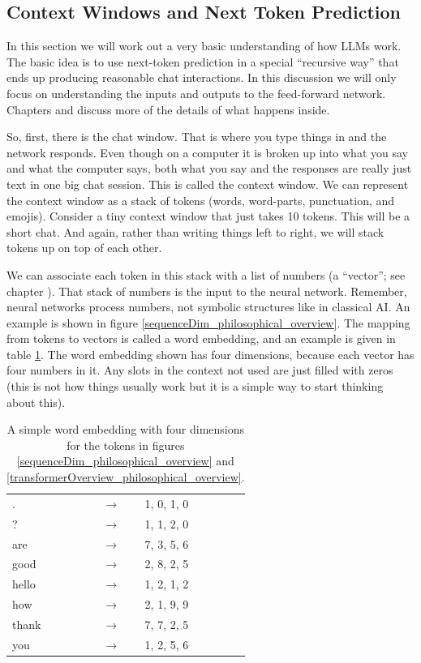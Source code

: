 \subsection{Context Windows and Next Token Prediction}

In this section we will work out a very basic understanding of how LLMs work. The basic idea is to use next-token prediction in a special ``recursive way'' that ends up producing reasonable chat interactions. In this discussion we will only focus on understanding the inputs and outputs to the feed-forward network. Chapters  and  discuss more of the details of what happens inside.

So, first, there is the chat window. That is where you type things in and the network responds. Even though on a computer it is broken up into what you say and what the computer says, both what you say and the responses are really just text in one big chat session. This is called the context window. We can represent the context window as a stack of tokens (words, word-parts, punctuation, and emojis). Consider a tiny context window that just takes 10 tokens. This will be a short chat. And again, rather than writing things left to right, we will stack tokens up on top of each other.

We can associate each token in this stack with a list of numbers (a ``vector''; see chapter ). That stack of numbers is the input to the neural network. Remember, neural networks process numbers, not symbolic structures like in classical AI. An example is shown in figure \ref{sequenceDim_philosophical_overview}. The mapping from tokens to vectors is called a word embedding, and an example is given in table \ref{embeddingTable_philosophical_overview}. The word embedding shown has four dimensions, because each vector has four numbers in it. Any slots in the context not used are just filled with zeros (this is not how things usually work but it is a simple way to start thinking about this).

\begin{table}[H]
\centering
\begin{tabular}{lcl}
  . & $\rightarrow$ & 1, 0, 1, 0 \\
  ? & $\rightarrow$ & 1, 1, 2, 0 \\
  are & $\rightarrow$ & 7, 3, 5, 6 \\
  good & $\rightarrow$ & 2, 8, 2, 5 \\
  hello & $\rightarrow$ & 1, 2, 1, 2 \\
  how & $\rightarrow$ & 2, 1, 9, 9 \\
  thank & $\rightarrow$ & 7, 7, 2, 5 \\
  you & $\rightarrow$ & 1, 2, 5, 6 \\
\end{tabular}
\caption{A simple word embedding with four dimensions for the tokens in figures \ref{sequenceDim_philosophical_overview} and \ref{transformerOverview_philosophical_overview}.}
\label{embeddingTable_philosophical_overview}
\end{table}

